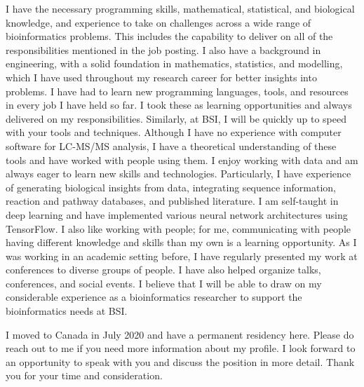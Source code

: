 \documentclass[11pt,a4paper,sans]{moderncv}        %
\makeatletter
\renewcommand*{\makeletterclosing}{
  \@closing\\ [0.2em]
  {\bfseries\@firstname~\@lastname}%
  \ifthenelse{\isundefined{\@enclosure}}{}{%
    \\%
    \vfil%
    {\color{color2}\itshape\enclname: \@enclosure}}%
    \vfil}
\makeatother
\begin{document}
I have the necessary programming skills, mathematical, statistical, and biological knowledge, and experience to take on challenges across a wide range of bioinformatics problems. This includes the capability to deliver on all of the responsibilities mentioned in the job posting. I also have a background in engineering, with a solid foundation in mathematics, statistics, and modelling, which I have used throughout my research career for better insights into problems. I have had to learn new programming languages, tools, and resources in every job I have held so far. I took these as learning opportunities and always delivered on my responsibilities. Similarly, at BSI, I will be quickly up to speed with your tools and techniques. Although I have no experience with computer software for LC-MS/MS analysis, I have a theoretical understanding of these tools and have worked with people using them. I enjoy working with data and am always eager to learn new skills and technologies. Particularly, I have experience of generating biological insights from data, integrating sequence information, reaction and pathway databases, and published literature. I am self-taught in deep learning and have implemented various neural network architectures using TensorFlow. I also like working with people; for me, communicating with people having different knowledge and skills than my own is a learning opportunity. As I was working in an academic setting before, I have regularly presented my work at conferences to diverse groups of people. I have also helped organize talks, conferences, and social events. I believe that I will be able to draw on my considerable experience as a bioinformatics researcher to support the bioinformatics needs at BSI.

I moved to Canada in July 2020 and have a permanent residency here. Please do reach out to me if you need more information about my profile. I look forward to an opportunity to speak with you and discuss the position in more detail. Thank you for your time and consideration.


\vspace*{0.3cm}


\makeletterclosing
\name{}{} %

\end{document}
